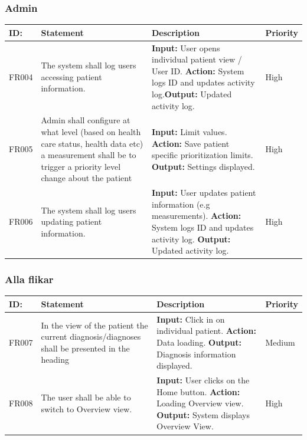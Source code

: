 \documentclass{scrreprt}
\begin{document}
\subsubsection{Admin}
\begin{center}
\begin{tabularx}{\linewidth}{| l | X | X | l |}
\hline
\textbf{ID:} & \textbf{Statement} & \textbf{Description} & \textbf{Priority} \\ 
\hline
FR004 & The system shall log users accessing patient information. & \textbf{Input:} User opens individual patient view / User ID.
\newline \textbf{Action:} System logs ID and updates activity log.\newline \textbf{Output:} Updated activity log. & High \\ 
\hline
FR005 & Admin shall configure at what level (based on health care status, health data etc) a measurement shall be to trigger a priority level change about the patient & \textbf{Input:} Limit values.
\newline \textbf{Action:} Save patient specific prioritization limits.
\newline \textbf{Output:} Settings displayed. &  High \\ 
\hline
FR006 & The system shall log users updating patient information. & \textbf{Input:} User updates patient information (e.g measurements).
\newline \textbf{Action:} System logs ID and updates activity log.
\newline \textbf{Output:} Updated activity log. & High \\ 
\hline
\end{tabularx}
\end{center}

\subsubsection{Alla flikar}
\begin{center}
\begin{tabularx}{\linewidth}{| l | X | X | l |}
\hline
\textbf{ID:} & \textbf{Statement} & \textbf{Description} & \textbf{Priority} \\ 
\hline
FR007 & In the view of the patient the current diagnosis/diagnoses shall be presented in the heading  & \textbf{Input:} Click in on individual patient.
\newline \textbf{Action:} Data loading.
\newline \textbf{Output:} Diagnosis information displayed. & Medium \\ 
\hline
FR008 & The user shall be able to switch to Overview view. & \textbf{Input:} User clicks on the Home button.
\newline \textbf{Action:} Loading Overview view.
\newline \textbf{Output:} System displays Overview View. & High \\ 
\hline
\end{tabularx}
\end{center}
\end{document}
